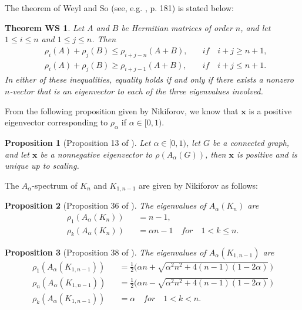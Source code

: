 \documentclass[amsthm]{elsart}
\newtheorem{proposition}{Proposition}[section]
\newtheorem*{thmWS}{Theorem WS}
\begin{document}
The theorem of Weyl and So (see, e.g. \cite{1985MatrixAnalysis}, p. 181) is stated below:
\begin{thmWS} \cite{1985MatrixAnalysis} Let $A$ and $B$ be Hermitian matrices of order $n$, and let $1 \leqslant i \leqslant n$ and $1 \leqslant j \leqslant n$.
Then
\begin{eqnarray*}
&\rho _i (A) + \rho _j (B) \leqslant \rho _{i+j-n} (A + B), \quad &if \quad i+j \geqslant n + 1,
\\ &\rho _i (A) + \rho _j (B) \geqslant \rho _{i+j-1} (A + B), \quad &if \quad i+j \leqslant n + 1.
\end{eqnarray*}
In either of these inequalities, equality holds if and only if there exists a nonzero $n$-vector that is an eigenvector to each of the three eigenvalues involved.
\end{thmWS}

From the following proposition given by Nikiforov, we know that $\textbf{x}$ is a positive eigenvector corresponding to $\rho _\alpha$ if $\alpha \in [0, 1)$.
\begin{proposition}[Proposition 13 of \cite{2016Merging}] \label{prop:perron}
Let $\alpha \in [0, 1)$, let $G$ be a connected graph, and let $\textbf{x}$ be a nonnegative eigenvector to $\rho( A_\alpha(G))$, then $\textbf{x}$ is positive and is unique up to scaling.
\end{proposition}

The $A_\alpha$-spectrum of $K_n$ and $K_{1,n-1}$ are given by Nikiforov as follows:
\begin{proposition}[Proposition 36 of \cite{2016Merging}] \label{prop:3}
The eigenvalues of $A_\alpha(K_n)$  are
\begin{eqnarray*}
\rho_1 (A_\alpha(K_n)) &&= n - 1 ,
\\ \rho _k (A_\alpha(K_n)) &&= \alpha n - 1 \quad for \quad 1 < k \leqslant n .
\end{eqnarray*}
\end{proposition}

\begin{proposition} [Proposition 38 of \cite{2016Merging}] \label{prop:1}
The eigenvalues of $A_\alpha(K_{1,n-1})$  are
\begin{eqnarray*}
\rho_1 (A_\alpha(K_{1,n-1})) &&= \frac{1}{2} \big( \alpha n + \sqrt{\alpha ^2 n^2 + 4(n-1)(1-2\alpha)} \, \big)
\\ \rho _n (A_\alpha(K_{1,n-1})) &&= \frac{1}{2} \big( \alpha n - \sqrt{\alpha ^2 n^2 + 4(n-1)(1-2\alpha)} \, \big)
\\ \rho _k (A_\alpha(K_{1,n-1})) &&= \alpha \quad for \quad 1<k<n.
\end{eqnarray*}
\end{proposition}
\end{document}
